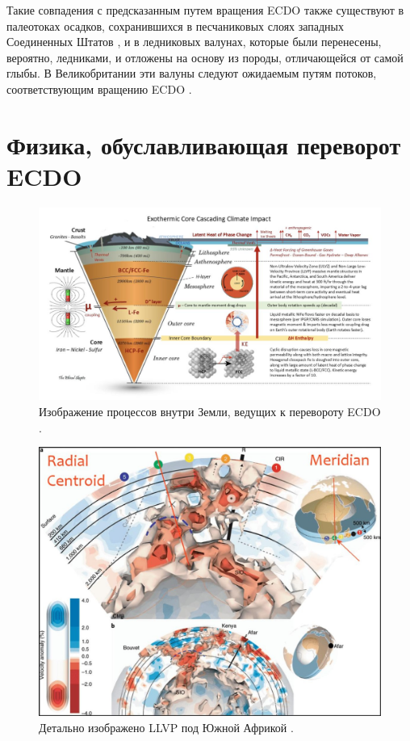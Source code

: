\documentclass[10pt,twocolumn,letterpaper]{article}
\begin{document}
Такие совпадения с предсказанным путем вращения ECDO также существуют в палеотоках осадков, сохранившихся в песчаниковых слоях западных Соединенных Штатов \cite{21}, и в ледниковых валунах, которые были перенесены, вероятно, ледниками, и отложены на основу из породы, отличающейся от самой глыбы. В Великобритании эти валуны следуют ожидаемым путям потоков, соответствующим вращению ECDO \cite{67,68}.

\section{Физика, обуславливающая переворот ECDO}

\begin{figure}[t]
\begin{center}
\includegraphics[width=1\textwidth]{layers.jpg}
\end{center}
   \caption{Изображение процессов внутри Земли, ведущих к перевороту ECDO \cite{129}.}
\label{fig:11}
\end{figure}

\begin{figure}[t]
\begin{center}
   \includegraphics[width=1\linewidth]{llvp.jpg}
\end{center}
   \caption{Детально изображено LLVP под Южной Африкой \cite{28}.}
\label{fig:12}
\label{fig:onecol}
\end{figure}
\end{document}
